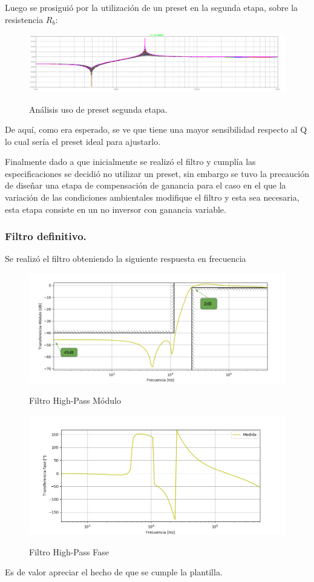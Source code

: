 Luego se prosiguió por la utilización de un preset en la segunda etapa, sobre la resistencia $R_b$:
\begin{figure}[H]
	\centering
	\includegraphics[width=\textwidth]{Imagenes-Ej3/mcPoteR3E2.png}
	\label{fig:presete2}
	\caption{Análisis uso de preset segunda etapa.}
\end{figure}
 De aquí, como era esperado, se ve que tiene una mayor sensibilidad respecto al Q lo cual sería el preset ideal para ajustarlo.

Finalmente dado a que inicialmente se realizó el filtro y cumplía las especificaciones se decidió no utilizar un preset, sin embargo se tuvo la precaución de diseñar una etapa de compensación de ganancia para el caso en el que la variación de las condiciones ambientales modifique el filtro y esta sea necesaria, esta etapa consiste en un no inversor con ganancia variable.

\subsubsection{Filtro definitivo.}
Se realizó el filtro obteniendo la siguiente respuesta en frecuencia 
\begin{figure}[H]
	\centering
	\includegraphics[width=\textwidth]{Imagenes-Ej3/BodeSedra.png}
	\label{fig:BodeSedra}
	\caption{Filtro High-Pass Módulo}
\end{figure}
\begin{figure}[H]
	\centering
	\includegraphics[width=\textwidth]{Imagenes-Ej3/FaseBodeSedra.png}
	\label{fig:FaseBodeSedra}
	\caption{Filtro High-Pass Fase}
\end{figure}
Es de valor apreciar el hecho de que se cumple la plantilla.


